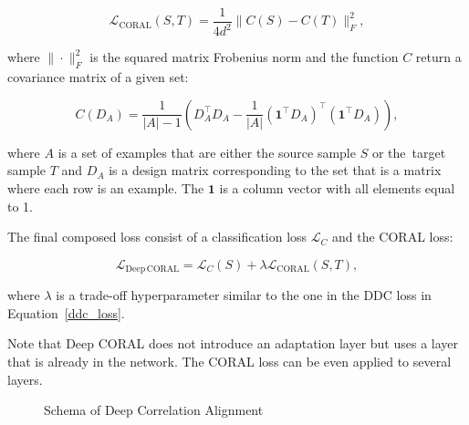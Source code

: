 \begin{equation}
	\mathcal{L}_{\mathrm{CORAL}}(S, T) = \frac{1}{4 d^2} \|C(S) - C(T)\|_F^2,
	\label{coral_loss}
\end{equation}

where \(\|\cdot\|_F^2\) is the squared matrix Frobenius norm
and the function \(C\) return a covariance matrix of a given set:

\begin{equation}
	C(D_A) = \frac{1}{|A| - 1} (D_A^\top D_A
	- \frac{1}{|A|} (\mathbf{1}^\top D_A)^\top (\mathbf{1}^\top D_A)),
	\label{deep_coral_loss}
\end{equation}

where \(A\) is a set of examples
that are either the source sample \(S\) or the~target sample \(T\)
and \(D_A\) is a design matrix corresponding to the set
that is a matrix where each row is an example.
The \(\mathbf{1}\) is a column vector with all elements equal to 1.

The final composed loss consist of a classification loss \(\mathcal{L}_C\)
and the CORAL loss:

\begin{equation}
	\mathcal{L}_{\mathrm{Deep\,CORAL}}
	= \mathcal{L}_C(S) + \lambda \mathcal{L}_{\mathrm{CORAL}}(S, T),
\end{equation}

where \(\lambda\) is a trade-off hyperparameter similar to the one in the DDC loss in Equation~\ref{ddc_loss}.

Note that Deep CORAL does not introduce an adaptation layer
but uses a layer that is already in the network.
The CORAL loss can be even applied to several layers.

\begin{figure}
\begin{center}
\end{center}
\caption{Schema of Deep Correlation Alignment}
\end{figure}

